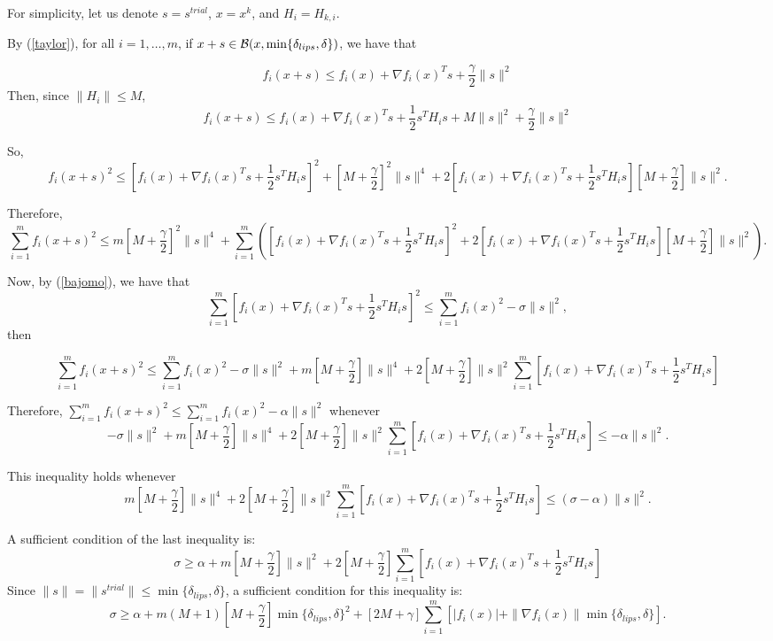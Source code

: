 \documentclass{article}
\newcommand{\B}{{\cal B}}
\begin{document}
For simplicity, let us denote $s = s^{trial}$, $x = x^k$, and $H_i = H_{k,i}$.  

  
 By (\ref{taylor}),  for all $i = 1, \ldots, m$, if $x + s \in \B(x, \min\{\delta_{lips}, \delta\})$,  we have that
 

\[
f_i(x+ s)  \leq f_i(x) + \nabla f_i(x)^T s + \frac{\gamma}{2} \|s\|^2
\]
Then, since $\|H_i\| \leq M$, 
\[
f_i(x+s) \leq f_i(x) +  \nabla f_i(x)^T s + \frac{1}{2} s^T H_i s + M \|s\|^2 + \frac{\gamma}{2} \|s\|^2  
\]

So,
\[
f_i(x+s)^2 \leq   [f_i(x) +  \nabla f_i(x)^T s + \frac{1}{2} s^T H_i s]^2 +   \left[M+\frac{\gamma}{2}\right]^2 \|s\|^4 
           + 2   [f_i(x) + \nabla f_i(x)^T s + \frac{1}{2} s^T H_i s]\left[M + \frac{\gamma}{2}\right]\|s\|^2.
\]


Therefore,
 \[
\sum_{i=1}^m f_i(x+s)^2 \leq m   \left[M+\frac{\gamma}{2}\right]^2 \|s\|^4 +  \sum_{i=1}^m
 \left( [f_i(x) +  \nabla f_i(x)^T s + \frac{1}{2} s^T H_i s]^2     
           + 2   [f_i(x) + \nabla f_i(x)^T s + \frac{1}{2} s^T H_i s]\left[M + \frac{\gamma}{2}\right]\|s\|^2\right).
\]  
  
Now,  by (\ref{bajomo}),  we have that
\[
\sum_{i=1}^m [f_i(x) + \nabla f_i(x)^T s +   \frac{1}{2} s^T H_i s]^2 \leq \sum_{i=1}^m f_i(x)^2 - \sigma \|s\|^2,
\]
then 


  \[
\sum_{i=1}^m f_i(x+s)^2 \leq \sum_{i=1}^m f_i(x)^2  -\sigma \|s\|^2  
     +  m  \left[M + \frac{\gamma}{2}\right] \|s\|^4   
           + 2  \left[M + \frac{\gamma}{2}\right]\|s\|^2 \sum_{i=1}^m   [f_i(x) + \nabla f_i(x)^T s + \frac{1}{2} s^T H_i s]
\]  

Therefore, $\sum_{i=1}^m f_i(x+s)^2 \leq \sum_{i=1}^m f_i(x)^2 - \alpha \|s\|^2$ whenever
\[
 -\sigma \|s\|^2  
     +  m  \left[M + \frac{\gamma}{2}\right] \|s\|^4   
           + 2  \left[M + \frac{\gamma}{2}\right]\|s\|^2 \sum_{i=1}^m   [f_i(x) + \nabla f_i(x)^T s + \frac{1}{2} s^T H_i s]    
\leq - \alpha \|s\|^2.
\]


This inequality holds whenever
 \[
       m  \left[M + \frac{\gamma}{2}\right] \|s\|^4   
           + 2  \left[M + \frac{\gamma}{2}\right]\|s\|^2 \sum_{i=1}^m   [f_i(x) + \nabla f_i(x)^T s + \frac{1}{2} s^T H_i s]    
\leq (\sigma - \alpha) \|s\|^2.
\]
                                           

A sufficient condition of the last inequality is:
  \[
 \sigma  \geq  \alpha +   m  \left[M + \frac{\gamma}{2}\right] \|s\|^2   
           + 2  \left[M + \frac{\gamma}{2}\right] \sum_{i=1}^m   [f_i(x) + \nabla f_i(x)^T s + \frac{1}{2} s^T H_i s]    
\]
Since $\|s\| = \|s^{trial}\| \leq \min\{\delta_{lips}, \delta\}$, a sufficient condition for this inequality is:
   \begin{equation} \label{sigmar}
 \sigma  \geq  \alpha +   m (M+1) \left[M + \frac{\gamma}{2} \right] \min\{\delta_{lips}, \delta\}^2   
           +   \left[2M+\gamma\right] \sum_{i=1}^m   [|f_i(x)| + \|\nabla f_i(x)\|\min\{\delta_{lips}, \delta\}].
\end{equation}  
 
\end{document}
